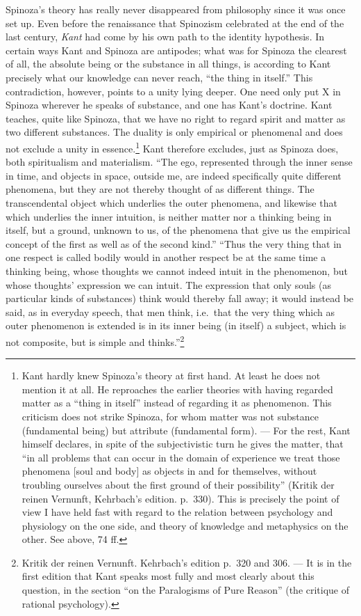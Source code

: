 \documentclass[12pt,a4paper]{book}
\newcommand{\opage}[1]{\marginnote{\footnotesize\textit{[#1]}}}
\begin{document}
Spinoza's theory has really never disappeared from philosophy since it
was once set up. Even before the renaissance that Spinozism celebrated
at the end of the last century, \emph{Kant} had come by his own path to
the identity hypothesis. In certain ways Kant and Spinoza are
antipodes; what was for Spinoza the clearest of all, the absolute being
or the substance in all things, is according to Kant precisely what our
knowledge can never reach, ``the thing in itself.'' This contradiction,
however, points to a unity lying deeper. One need only put X in Spinoza
wherever he speaks of substance, and one has Kant's doctrine. Kant
teaches, quite like
\opage{82}Spinoza, that we have no right to regard spirit and matter as
two different substances. The duality is only empirical or phenomenal
and does not exclude a unity in essence.\footnote{Kant hardly knew
Spinoza's theory at first hand. At least he does not mention it at all.
He reproaches the earlier theories with having regarded matter as a
``thing in itself'' instead of regarding it as phenomenon. This
criticism does not strike Spinoza, for whom matter was not substance
(fundamental being) but attribute (fundamental form). --- For the rest,
Kant himself declares, in spite of the subjectivistic turn he gives the
matter, that ``in all problems that can occur in the domain of
experience we treat those phenomena [soul and body] as objects in and
for themselves, without troubling ourselves about the first ground of
their possibility'' (Kritik der reinen Vernunft, Kehrbach's edition.
p.~330). This is precisely the point of view I have held fast with
regard to the relation between psychology and physiology on the one
side, and theory of knowledge and metaphysics on the other. See above,
74 ff.} Kant therefore excludes, just as Spinoza does, both
spiritualism and materialism. ``The ego, represented through the inner
sense in time, and objects in space, outside me, are indeed
specifically quite different phenomena, but they are not thereby
thought of as different things. The transcendental object which
underlies the outer phenomena, and likewise that which underlies the
inner intuition, is neither matter nor a thinking being in itself, but
a ground, unknown to us, of the phenomena that give us the empirical
concept of the first as well as of the second kind.'' ``Thus the very
thing that in one respect is called bodily would in another respect be
at the same time a thinking being, whose thoughts we cannot indeed
intuit in the phenomenon, but whose thoughts' expression we can
intuit. The expression that only souls (as particular kinds of
substances) think would thereby fall away; it would instead be said, as
in everyday speech, that men think, i.e.\ that the very thing which as
outer phenomenon is extended is in its inner being (in itself) a
subject, which is not composite, but is simple and
thinks.''\footnote{Kritik der reinen Vernunft. Kehrbach's edition p.~320
and 306. --- It is in the first edition that Kant speaks most fully and
most clearly about this question, in the section ``on the Paralogisms
of Pure Reason'' (the critique of rational psychology).}
\end{document}
